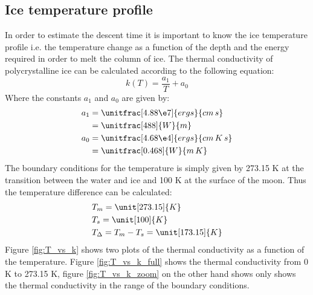 \subsection{Ice temperature profile}\label{sec:IceTemperatureProfile}

%

In order to estimate the descent time it is important to know the ice temperature profile i.e. the temperature change as a function of the depth and the energy required in order to melt the column of ice. The thermal conductivity of polycrystalline ice can be calculated according to the following equation\cite[(2.3)]{article:thermalConductivity}:
\begin{equation}
	k(T) = \frac{a_1}{T} + a_0
\end{equation}
Where the constants $a_1$ and $a_0$ are given by:
\begin{align}
	a_1 &= \unitfrac[4.88 \e7]{ergs}{cm \, s} \\ \nonumber
		&= \unitfrac[488]{W}{m} \\
	a_0 &= \unitfrac[4.68 \e4]{ergs}{cm \, K \, s} \\ \nonumber
		&= \unitfrac[0.468]{W}{m \, K}
\end{align}
The boundary conditions for the temperature is simply given by 273.15 K at the transition between the water and ice and 100 K at the surface of the moon\cite{article:thermalConductivity}. Thus the temperature difference can be calculated:
\begin{align}
	& T_m = \unit[273.15]{K} \\
	& T_s = \unit[100]{K} \\
	& T_\Delta = T_m - T_s = \unit[173.15]{K}
\end{align}
Figure \ref{fig:T_vs_k} shows two plots of the thermal conductivity as a function of the temperature. Figure \ref{fig:T_vs_k_full} shows the thermal conductivity from 0 K to 273.15 K, figure \ref{fig:T_vs_k_zoom} on the other hand shows only shows the thermal conductivity in the range of the boundary conditions.
